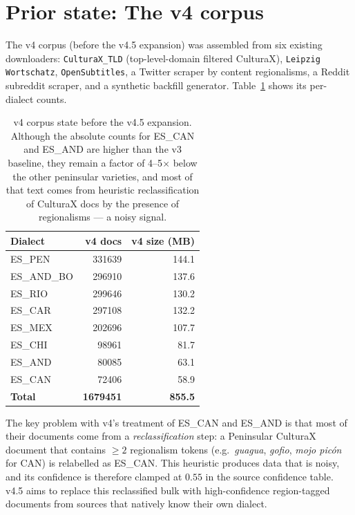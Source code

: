 \documentclass[11pt,a4paper]{article}
\begin{document}
\section{Prior state: The v4 corpus}

The v4 corpus (before the v4.5 expansion) was assembled from six existing
downloaders: \texttt{CulturaX\_TLD} (top-level-domain filtered CulturaX),
\texttt{Leipzig Wortschatz}, \texttt{OpenSubtitles}, a Twitter scraper by
content regionalisms, a Reddit subreddit scraper, and a synthetic backfill
generator. Table~\ref{tab:v4-state} shows its per-dialect counts.

\begin{table}[h]
\centering
\begin{tabular}{l r r}
\toprule
\textbf{Dialect} & \textbf{v4 docs} & \textbf{v4 size (MB)} \\
\midrule
ES\_PEN     & \num{331639} & 144.1 \\
ES\_AND\_BO & \num{296910} & 137.6 \\
ES\_RIO     & \num{299646} & 130.2 \\
ES\_CAR     & \num{297108} & 132.2 \\
ES\_MEX     & \num{202696} & 107.7 \\
ES\_CHI     & \num{98961}  &  81.7 \\
ES\_AND     & \num{80085}  &  63.1 \\
ES\_CAN     & \num{72406}  &  58.9 \\
\midrule
\textbf{Total} & \textbf{\num{1679451}} & \textbf{855.5} \\
\bottomrule
\end{tabular}
\caption{v4 corpus state before the v4.5 expansion. Although the absolute
counts for ES\_CAN and ES\_AND are higher than the v3 baseline, they
remain a factor of 4--5$\times$ below the other peninsular varieties, and
most of that text comes from heuristic reclassification of CulturaX docs
by the presence of regionalisms --- a noisy signal.}
\label{tab:v4-state}
\end{table}

The key problem with v4's treatment of ES\_CAN and ES\_AND is that most of
their documents come from a \emph{reclassification} step: a Peninsular
CulturaX document that contains $\geq 2$ regionalism tokens
(e.g.\ \emph{guagua}, \emph{gofio}, \emph{mojo picón} for CAN) is
relabelled as ES\_CAN. This heuristic produces data that is noisy, and
its confidence is therefore clamped at $0.55$ in the source confidence
table. v4.5 aims to replace this reclassified bulk with high-confidence
region-tagged documents from sources that natively know their own dialect.
\end{document}
